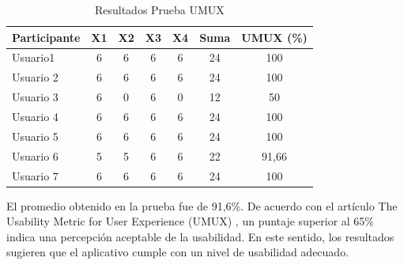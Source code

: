 \documentclass[spanish]{ieee_upb}
\begin{document}
\begin{table}[H]
    \centering
    \caption{Resultados Prueba UMUX}
    \label{tabla:resultadosumux}
\begin{tabular}{lcccccc}
\hline
\textbf{Participante} & \multicolumn{1}{l}{\textbf{X1}} & \multicolumn{1}{l}{\textbf{X2}} & \multicolumn{1}{l}{\textbf{X3}} & \multicolumn{1}{l}{\textbf{X4}} & \multicolumn{1}{l}{\textbf{Suma}} & \multicolumn{1}{l}{\textbf{UMUX (\%)}} \\ \hline
Usuario1              & 6                               & 6                               & 6                               & 6                               & 24                                & 100                                    \\
Usuario 2             & 6                               & 6                               & 6                               & 6                               & 24                                & 100                                    \\
Usuario 3             & 6                               & 0                               & 6                               & 0                               & 12                                & 50                                     \\
Usuario 4             & 6                               & 6                               & 6                               & 6                               & 24                                & 100                                    \\
Usuario 5             & 6                               & 6                               & 6                               & 6                               & 24                                & 100                                    \\
Usuario 6             & 5                               & 5                               & 6                               & 6                               & 22                                & 91,66                                  \\
Usuario 7             & 6                               & 6                               & 6                               & 6                               & 24                                & 100                                    \\ \hline
\end{tabular}
\end{table}
El promedio obtenido en la prueba fue de 91,6\%. De acuerdo con el artículo The Usability Metric for User Experience (UMUX) \cite{umux}, un puntaje superior al 65\% indica una percepción aceptable de la usabilidad. En este sentido, los resultados sugieren que el aplicativo cumple con un nivel de usabilidad adecuado.
\end{document}
